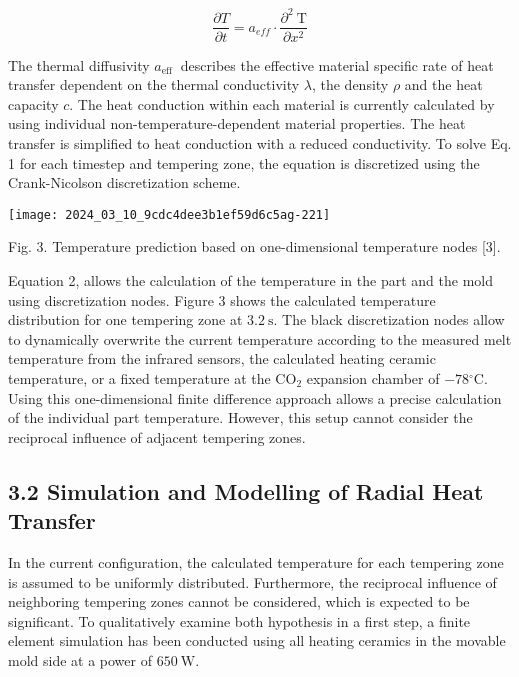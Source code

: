 \documentclass[10pt]{article}
\begin{document}
\begin{equation*}
\frac{\partial T}{\partial t}=a_{e f f} \cdot \frac{\partial^{2} \mathrm{~T}}{\partial x^{2}} \tag{1}
\end{equation*}


The thermal diffusivity $a_{\text {eff }}$ describes the effective material specific rate of heat transfer dependent on the thermal conductivity $\lambda$, the density $\rho$ and the heat capacity $c$. The heat conduction within each material is currently calculated by using individual non-temperature-dependent material properties. The heat transfer is simplified to heat conduction with a reduced conductivity. To solve Eq. 1 for each timestep and tempering zone, the equation is discretized using the Crank-Nicolson discretization scheme.

\begin{center}
\texttt{[image: 2024\_03\_10\_9cdc4dee3b1ef59d6c5ag-221]}
\end{center}

Fig. 3. Temperature prediction based on one-dimensional temperature nodes [3].

Equation 2, allows the calculation of the temperature in the part and the mold using discretization nodes. Figure 3 shows the calculated temperature distribution for one tempering zone at $3.2 \mathrm{~s}$. The black discretization nodes allow to dynamically overwrite the current temperature according to the measured melt temperature from the infrared sensors, the calculated heating ceramic temperature, or a fixed temperature at the $\mathrm{CO}_{2}$ expansion chamber of $-78{ }^{\circ} \mathrm{C}$. Using this one-dimensional finite difference approach allows a precise calculation of the individual part temperature. However, this setup cannot consider the reciprocal influence of adjacent tempering zones.

\subsection*{3.2 Simulation and Modelling of Radial Heat Transfer}
In the current configuration, the calculated temperature for each tempering zone is assumed to be uniformly distributed. Furthermore, the reciprocal influence of neighboring tempering zones cannot be considered, which is expected to be significant. To qualitatively examine both hypothesis in a first step, a finite element simulation has been conducted using all heating ceramics in the movable mold side at a power of $650 \mathrm{~W}$.
\end{document}
